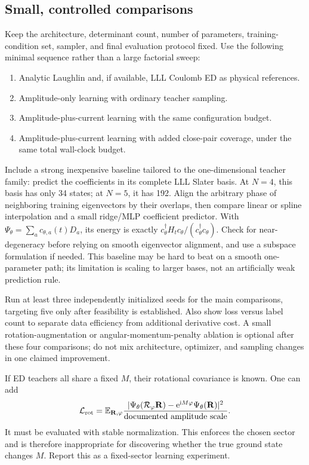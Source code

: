 \documentclass[11pt,letterpaper]{article}
\newcommand{\R}{\mathbf R}
\newcommand{\ee}{\mathrm e}
\newcommand{\ii}{\mathrm i}
\begin{document}
\subsection{Small, controlled comparisons}

Keep the architecture, determinant count, number of parameters, training-condition set, sampler, and final evaluation protocol fixed. Use the following minimal sequence rather than a large factorial sweep:
\begin{enumerate}
\item Analytic Laughlin and, if available, LLL Coulomb ED as physical references.
\item Amplitude-only learning with ordinary teacher sampling.
\item Amplitude-plus-current learning with the same configuration budget.
\item Amplitude-plus-current learning with added close-pair coverage, under the same total wall-clock budget.
\end{enumerate}
Include a strong inexpensive baseline tailored to the one-dimensional teacher family: predict the coefficients in its complete LLL Slater basis. At $N=4$, this basis has only 34 states; at $N=5$, it has 192. Align the arbitrary phase of neighboring training eigenvectors by their overlaps, then compare linear or spline interpolation and a small ridge/MLP coefficient predictor. With $\Psi_\theta=\sum_a c_{\theta,a}(t)D_a$, its energy is exactly $c_\theta^\dagger H_t c_\theta/(c_\theta^\dagger c_\theta)$. Check for near-degeneracy before relying on smooth eigenvector alignment, and use a subspace formulation if needed. This baseline may be hard to beat on a smooth one-parameter path; its limitation is scaling to larger bases, not an artificially weak prediction rule.

Run at least three independently initialized seeds for the main comparisons, targeting five only after feasibility is established. Also show loss versus label count to separate data efficiency from additional derivative cost. A small rotation-augmentation or angular-momentum-penalty ablation is optional after these four comparisons; do not mix architecture, optimizer, and sampling changes in one claimed improvement.

If ED teachers all share a fixed $M$, their rotational covariance is known. One can add
\begin{equation}
 \mathcal L_{\rm rot}=\mathbb E_{\R,\varphi}
 \frac{|\Psi_\theta(\mathcal R_\varphi\R)-\ee^{\ii M\varphi}\Psi_\theta(\R)|^2}{\text{documented amplitude scale}}.
\end{equation}
It must be evaluated with stable normalization. This enforces the chosen sector and is therefore inappropriate for discovering whether the true ground state changes $M$. Report this as a fixed-sector learning experiment.
\end{document}
